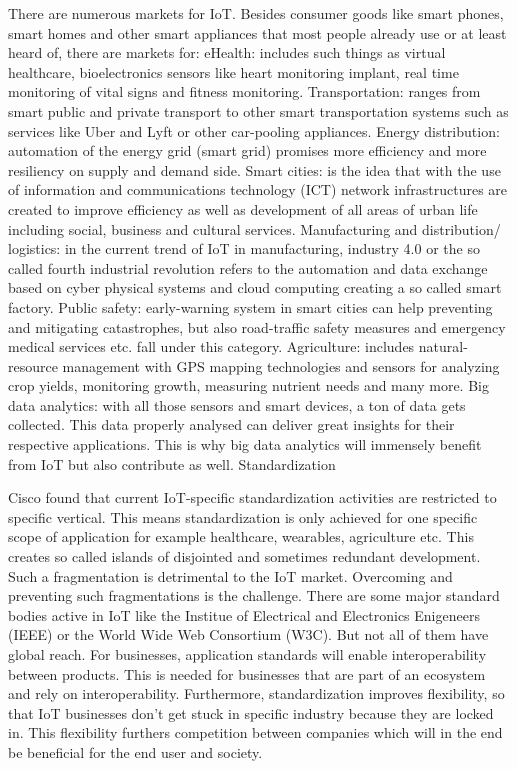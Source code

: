 There are numerous markets for IoT. Besides consumer goods like smart phones, smart homes and other smart appliances that most people already use or at least heard of, there are markets for:
eHealth:  includes such things as virtual healthcare, bioelectronics sensors  like heart monitoring implant, real time monitoring of vital signs and fitness monitoring.
Transportation:  ranges from smart public and private transport to other smart transportation systems such as services like Uber and Lyft or other car-pooling appliances. 
Energy distribution: automation of the energy grid (smart grid) promises more efficiency and more resiliency on supply and demand side.
Smart cities: is the idea that with the use of information and communications technology (ICT) network infrastructures are created to improve efficiency as well as development of all areas of urban life including social, business and cultural services.
Manufacturing and distribution/ logistics: in the current trend of IoT in manufacturing, industry 4.0 or the so called fourth industrial revolution refers to the automation and data exchange based on cyber physical systems and cloud computing creating a so called smart factory. 
Public safety: early-warning system in smart cities can help preventing and mitigating catastrophes, but also road-traffic safety measures and emergency medical services etc. fall under this category.
Agriculture: includes natural-resource management with GPS mapping technologies and sensors for analyzing crop yields, monitoring growth, measuring nutrient needs and many more.
Big data analytics: with all those sensors and smart devices, a ton of data gets collected. This data properly analysed can deliver great insights for their respective applications. This is why big data analytics will immensely benefit from IoT but also contribute as well.
 Standardization

Cisco found that current IoT-specific standardization activities are restricted to specific vertical. This means standardization is only achieved for one specific scope of application for example healthcare, wearables, agriculture etc. This creates so called islands of disjointed and sometimes redundant development.
Such a fragmentation is detrimental to the IoT market. Overcoming and preventing such fragmentations is the challenge. There are some major standard bodies active in IoT like the Institue of Electrical and Electronics Enigeneers (IEEE) or the World Wide Web Consortium (W3C). But not all of them have global reach.
For businesses, application standards will enable interoperability between products.  This is needed for businesses that are part of an ecosystem and rely on interoperability. Furthermore, standardization improves flexibility, so that IoT businesses don't get stuck in specific industry because they are locked in. This flexibility furthers competition between companies which will in the end be beneficial for the end user and society.




